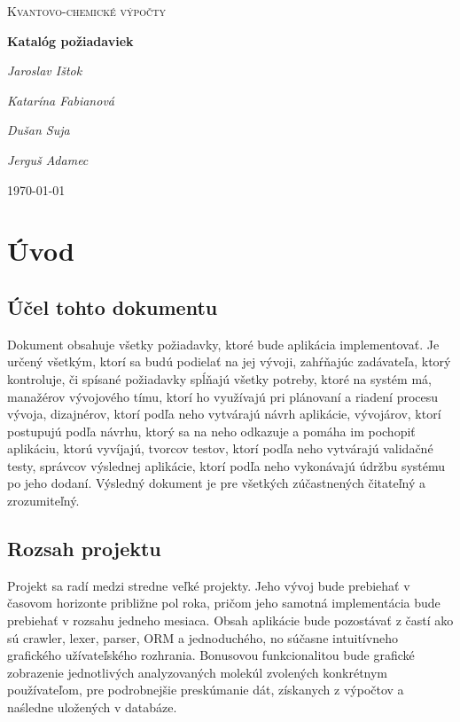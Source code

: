 \documentclass[12pt,a4paper]{article}
\begin{document}
\begin{titlepage}
	\centering
	\par\vspace{1cm}
	{\scshape\LARGE Kvantovo-chemické výpočty \par}
	\vspace{1cm}

	{\huge\bfseries Katalóg požiadaviek  \par}
	\vspace{2cm}
	{\Large\itshape Jaroslav Ištok \par}
	{\Large\itshape Katarína Fabianová \par}
	{\Large\itshape Dušan Suja \par}
	{\Large\itshape Jerguš Adamec \par}
	\vfill
	{\large \today\par}
\end{titlepage}

\pagebreak

\tableofcontents

\pagebreak

\section{Úvod}

\subsection{Účel tohto dokumentu}
Dokument obsahuje všetky požiadavky, ktoré bude aplikácia implementovať. Je určený všetkým, ktorí sa budú podielať na jej vývoji, zahŕňajúc zadávateľa, ktorý kontroluje, či spísané požiadavky spĺňajú všetky potreby, ktoré na systém má, manažérov vývojového tímu, ktorí ho využívajú pri plánovaní a riadení procesu vývoja, dizajnérov, ktorí podľa neho vytvárajú návrh aplikácie, vývojárov, ktorí postupujú podľa návrhu, ktorý sa na neho odkazuje a pomáha im pochopiť aplikáciu, ktorú vyvíjajú, tvorcov testov, ktorí podľa neho vytvárajú validačné testy, správcov výslednej aplikácie, ktorí podľa neho vykonávajú údržbu systému po jeho dodaní. Výsledný dokument je pre všetkých zúčastnených čitateľný a zrozumiteľný.

\subsection{Rozsah projektu}
Projekt sa radí medzi stredne veľké projekty. Jeho vývoj bude prebiehať v časovom horizonte približne pol roka, pričom jeho samotná implementácia bude prebiehať v rozsahu jedneho mesiaca. Obsah aplikácie bude pozostávať z častí ako sú crawler, lexer, parser, ORM a jednoduchého, no súčasne intuitívneho grafického užívateľského rozhrania.
Bonusovou funkcionalitou bude grafické zobrazenie jednotlivých analyzovaných molekúl zvolených konkrétnym používateľom, pre podrobnejšie preskúmanie dát, získanych z výpočtov a naśledne uložených v databáze.
\end{document}
